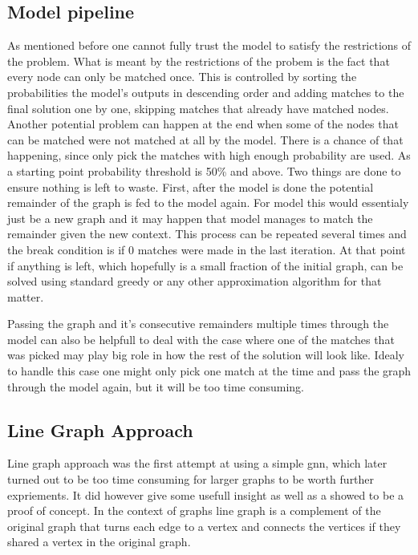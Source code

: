\subsection{Model pipeline}

As mentioned before one cannot fully trust the model to satisfy the restrictions of the problem. What is meant by the restrictions of the probem is the fact that every node can only be matched once. This is controlled by sorting the probabilities the model's outputs in descending order and adding matches to the final solution one by one, skipping matches that already have matched nodes. Another potential problem can happen at the end when some of the nodes that can be matched were not matched at all by the model. There is a chance of that happening, since only pick the matches with high enough probability are used. As a starting point probability threshold is 50\% and above. Two things are done to ensure nothing is left to waste. First, after the model is done the potential remainder of the graph is fed to the model again. For model this would essentialy just be a new graph and it may happen that model manages to match the remainder given the new context. This process can be repeated several times and the break condition is if 0 matches were made in the last iteration. At that point if anything is left, which hopefully is a small fraction of the initial graph, can be solved using standard greedy or any other approximation algorithm for that matter.

Passing the graph and it's consecutive remainders multiple times through the model can also be helpfull to deal with the case where one of the matches that was picked may play big role in how the rest of the solution will look like. Idealy to handle this case one might only pick one match at the time and pass the graph through the model again, but it will be too time consuming.

\subsection{Line Graph Approach}

Line graph approach was the first attempt at using a simple \gls{gnn}, which later turned out to be too time consuming for larger graphs to be worth further expriements. It did however give some usefull insight as well as a showed to be a proof of concept. In the context of graphs line graph is a complement of the original graph that turns each edge to a vertex and connects the vertices if they shared a vertex in the original graph. 


